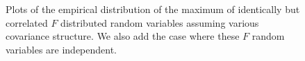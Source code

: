 \documentclass[times,sort&compress,3p]{elsarticle}
\theoremstyle{plain}%
\theoremstyle{definition}
\begin{document}
\begin{figure}
  \centering
{}
{}
  \label{fig:fig2}
\caption{Plots of the empirical distribution of the maximum of identically but correlated $F$ distributed random variables assuming various covariance structure. We also add the case where these $F$ random variables are independent.}
\label{fig:fmaxquant}
\end{figure}
\end{document}
